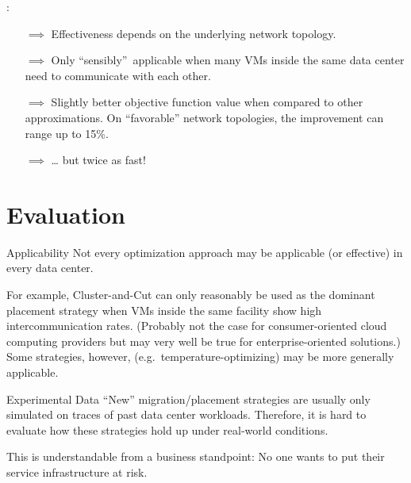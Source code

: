 \documentclass[aspectratio=169]{beamer}
\begin{document}
\begin{frame}{\insertsectionhead: \insertsubsectionhead}
    \begin{itemize}
        \item [\(\implies\)]
            Effectiveness depends on the underlying network topology.

        \item [\(\implies\)]
            Only \enquote{sensibly} applicable when many VMs inside the same data center need to communicate with each other.

        \item [\(\implies\)]
            Slightly better objective function value when compared to other approximations.
            On \enquote{favorable} network topologies, the improvement can range up to 15\%.

        \item [\(\implies\)]
            \dots{} but twice as fast!
    \end{itemize}
\end{frame}

\section{Evaluation}

\begin{frame}{\insertsectionhead}
    \begin{Ldescription}
        \item [Applicability]
            Not every optimization approach may be applicable (or effective) in every data center.

            For example, Cluster-and-Cut can only reasonably be used as the dominant placement strategy when VMs inside the same facility show high intercommunication rates.
            (Probably not the case for consumer-oriented cloud computing providers but may very well be true for enterprise-oriented solutions.)
            Some strategies, however, (e.g.\ temperature-optimizing) may be more generally applicable.
    \end{Ldescription}
\end{frame}

\begin{frame}{\insertsectionhead}
    \begin{Ldescription}
        \item [Experimental Data]
            \enquote{New} migration/placement strategies are usually only simulated on traces of past data center workloads.
            Therefore, it is hard to evaluate how these strategies hold up under real-world conditions.

            This is understandable from a business standpoint:
            No one wants to put their service infrastructure at risk.
    \end{Ldescription}
\end{frame}
\end{document}
